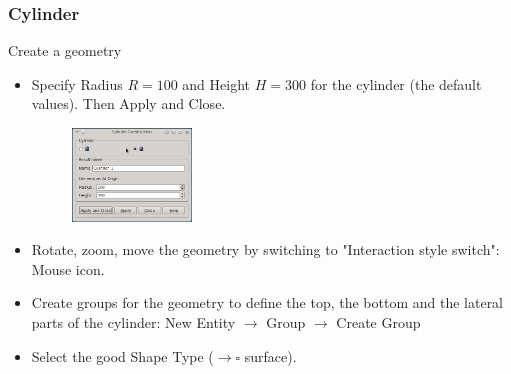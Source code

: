 \documentclass[10pt, hyperref={unicode=true,pdfusetitle, bookmarks=true,bookmarksnumbered=false,bookmarksopen=false, breaklinks=false,pdfborder={0 0 1},backref=true,colorlinks=true,linkcolor=darkblue,pageanchor}]{beamer}
\begin{document}
\begin{frame}
\frametitle{Cylinder}
\begin{block}{Create a geometry}

\begin{itemize}
\item Specify Radius $R=100$ and Height $H=300$ for the cylinder (the default values). Then Apply and Close.
\begin{figure}
\includegraphics[width=0.3\textwidth]{PICTURES/salome2.jpg}
\end{figure}

\item Rotate, zoom, move the geometry by switching to "Interaction style switch": Mouse icon.

\item Create groups for the geometry to define the top, the bottom and the lateral parts of the cylinder: New Entity $\rightarrow$ Group $\rightarrow$ Create Group

\item Select the good Shape Type ($\rightarrow \square$ surface).
\end{itemize}

\end{block}
\end{frame}
\end{document}
